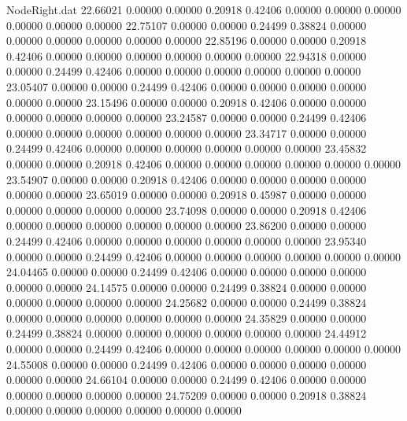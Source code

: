 \begin{filecontents}{NodeRight.dat}
  22.66021    0.00000    0.00000     0.20918    0.42406    0.00000    0.00000    0.00000    0.00000    0.00000    0.00000
  22.75107    0.00000    0.00000     0.24499    0.38824    0.00000    0.00000    0.00000    0.00000    0.00000    0.00000
  22.85196    0.00000    0.00000     0.20918    0.42406    0.00000    0.00000    0.00000    0.00000    0.00000    0.00000
  22.94318    0.00000    0.00000     0.24499    0.42406    0.00000    0.00000    0.00000    0.00000    0.00000    0.00000
  23.05407    0.00000    0.00000     0.24499    0.42406    0.00000    0.00000    0.00000    0.00000    0.00000    0.00000
  23.15496    0.00000    0.00000     0.20918    0.42406    0.00000    0.00000    0.00000    0.00000    0.00000    0.00000
  23.24587    0.00000    0.00000     0.24499    0.42406    0.00000    0.00000    0.00000    0.00000    0.00000    0.00000
  23.34717    0.00000    0.00000     0.24499    0.42406    0.00000    0.00000    0.00000    0.00000    0.00000    0.00000
  23.45832    0.00000    0.00000     0.20918    0.42406    0.00000    0.00000    0.00000    0.00000    0.00000    0.00000
  23.54907    0.00000    0.00000     0.20918    0.42406    0.00000    0.00000    0.00000    0.00000    0.00000    0.00000
  23.65019    0.00000    0.00000     0.20918    0.45987    0.00000    0.00000    0.00000    0.00000    0.00000    0.00000
  23.74098    0.00000    0.00000     0.20918    0.42406    0.00000    0.00000    0.00000    0.00000    0.00000    0.00000
  23.86200    0.00000    0.00000     0.24499    0.42406    0.00000    0.00000    0.00000    0.00000    0.00000    0.00000
  23.95340    0.00000    0.00000     0.24499    0.42406    0.00000    0.00000    0.00000    0.00000    0.00000    0.00000
  24.04465    0.00000    0.00000     0.24499    0.42406    0.00000    0.00000    0.00000    0.00000    0.00000    0.00000
  24.14575    0.00000    0.00000     0.24499    0.38824    0.00000    0.00000    0.00000    0.00000    0.00000    0.00000
  24.25682    0.00000    0.00000     0.24499    0.38824    0.00000    0.00000    0.00000    0.00000    0.00000    0.00000
  24.35829    0.00000    0.00000     0.24499    0.38824    0.00000    0.00000    0.00000    0.00000    0.00000    0.00000
  24.44912    0.00000    0.00000     0.24499    0.42406    0.00000    0.00000    0.00000    0.00000    0.00000    0.00000
  24.55008    0.00000    0.00000     0.24499    0.42406    0.00000    0.00000    0.00000    0.00000    0.00000    0.00000
  24.66104    0.00000    0.00000     0.24499    0.42406    0.00000    0.00000    0.00000    0.00000    0.00000    0.00000
  24.75209    0.00000    0.00000     0.20918    0.38824    0.00000    0.00000    0.00000    0.00000    0.00000    0.00000

\end{filecontents}
